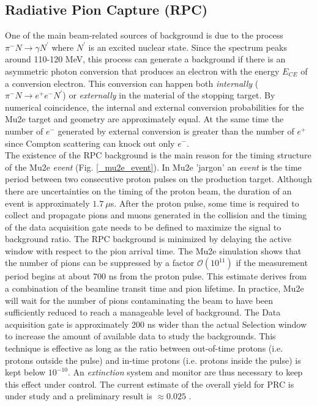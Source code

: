\documentclass[12pt,a4paper,openright, oneside, titlepage]{book} %
\begin{document}
\subsection{Radiative Pion Capture (RPC)}
One of the main beam-related sources of background is due to the process
$\pi^- N \rightarrow \gamma N^\prime$ where $N^\prime$ is an excited nuclear state. 
Since the spectrum peaks around 110-120 MeV, this process can generate
a background if there is an asymmetric photon conversion that produces
an electron with the energy $E_{CE}$ of a conversion electron. 
This conversion can happen both \textit{internally} ($\pi^- N \rightarrow e^+e^- N^\prime$) or \textit{externally}
in the material of the stopping target.
By numerical coincidence, the internal and external conversion probabilities for the Mu2e target and geometry are approximately equal. At the same time the number of $e^-$ generated by external conversion is greater than the number of $e^+$ since Compton scattering can knock out only $e^-$.\\
The existence of the RPC background is the main reason for the timing structure of the Mu2e \textit{event} (Fig. \ref{_mu2e_event}). 
In Mu2e 'jargon' an \textit{event}  is the time period between two consecutive proton pulses on the production target. 
Although there are  uncertainties on the timing of the proton beam, 
the duration of an event is approximately $1.7\ \mu$s. 
After the proton pulse, some time is required to collect and propagate pions and muons generated in the collision 
and the timing of the data acquisition gate needs to be defined to maximize the signal to background ratio.
The RPC background is minimized by delaying the active window
with respect to the pion arrival time. 
The Mu2e simulation shows that the number of pions can be suppressed 
by a factor $\mathcal{O}(10^{11})$ 
if the measurement period begins at about 700 ns from the proton pulse.
This estimate derives from a combination of the beamline transit time 
and pion lifetime.
In practice, Mu2e will wait for the number of pions contaminating the beam 
to have been sufficiently reduced to reach a manageable level of background.
The Data acquisition gate is approximately 200 ns wider than the actual Selection window
to increase the amount of available data to study the backgrounds.
This technique is effective as long as the ratio between out-of-time protons 
(i.e. protons outside the pulse) and in-time protons (i.e. protons inside the pulse)
is kept below $10^{-10}$. 
An \textit{extinction} system and monitor are thus necessary to keep this effect
under control.
The current estimate of the overall yield for PRC is under study and a preliminary result is $\approx 0.025$ \cite{RPC_now}.
\end{document}
